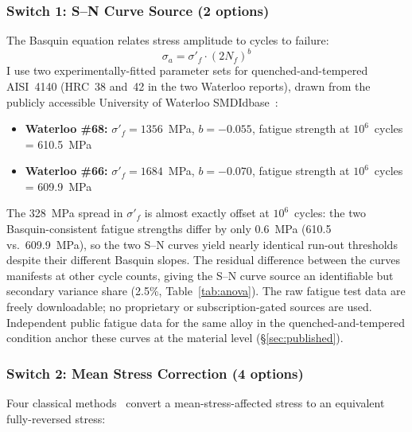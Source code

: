 \documentclass[twocolumn,12pt,a4paper]{article}
\begin{document}
\subsubsection{Switch 1: S--N Curve Source (2 options)}

The Basquin equation relates stress amplitude to cycles to failure:
\begin{equation}
\sigma_a = \sigma'_f \cdot (2N_f)^b
\label{eq:basquin}
\end{equation}
I use two experimentally-fitted
parameter sets for quenched-and-tempered AISI~4140 (HRC~38 and~42 in
the two Waterloo reports), drawn from the publicly accessible
University of Waterloo SMDIdbase~\cite{waterloo_fde}:

\begin{itemize}
  \item \textbf{Waterloo \#68:} $\sigma'_f = 1356$~MPa, $b=-0.055$,
        fatigue strength at $10^6$~cycles = 610.5~MPa
  \item \textbf{Waterloo \#66:} $\sigma'_f = 1684$~MPa, $b=-0.070$,
        fatigue strength at $10^6$~cycles = 609.9~MPa
\end{itemize}

The 328~MPa spread in $\sigma'_f$ is almost exactly offset at
$10^6$~cycles: the two Basquin-consistent fatigue strengths differ by
only 0.6~MPa (610.5 vs.\ 609.9~MPa), so the two S--N curves yield
nearly identical run-out thresholds despite their different Basquin
slopes. The residual difference between the curves manifests at other
cycle counts, giving the S--N curve source an identifiable but
secondary variance share (2.5\%, Table~\ref{tab:anova}).
The raw fatigue test data are freely downloadable; no proprietary or
subscription-gated sources are used. Independent public fatigue data
for the same alloy in the quenched-and-tempered condition anchor these
curves at the material level (\S\ref{sec:published}).

\subsubsection{Switch 2: Mean Stress Correction (4 options)}

Four classical methods~\cite{stephens2001} convert a mean-stress-affected stress to an
equivalent fully-reversed stress:
\end{document}
